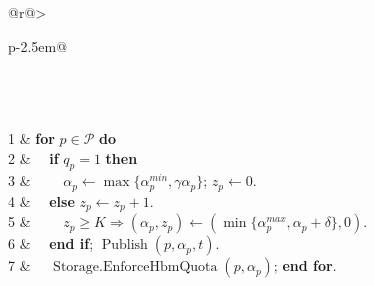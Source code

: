 \begin{algorithm}[tp]
\caption{\textsc{HBMQuotaAIMD}: Peer-HBM protection share}
\label{alg:guarded-aimd}
\begin{tabular}{@{}r@{\hspace{0.5em}}>{\raggedright\arraybackslash}p{\dimexpr\columnwidth-2.5em\relax}@{}}
\\
\\
\\
1 & \textbf{for} $p\in\mathcal P$ \textbf{do}\\
2 & $\quad$\textbf{if} $q_p=1$ \textbf{then}\\
3 & $\qquad\alpha_p\gets\max\{\alpha_p^{min},\gamma\alpha_p\}$; $z_p\gets0$.\\
4 & $\quad$\textbf{else} $z_p\gets z_p+1$.\\
5 & $\qquad z_p\ge K\Rightarrow(\alpha_p,z_p)\gets(\min\{\alpha_p^{max},\alpha_p+\delta\},0)$.\\
6 & $\quad$\textbf{end if}; $\operatorname{Publish}(p,\alpha_p,t)$.\\
7 & $\quad\operatorname{Storage.EnforceHbmQuota}(p,\alpha_p)$; \textbf{end for}.\\
\end{tabular}
\end{algorithm}
